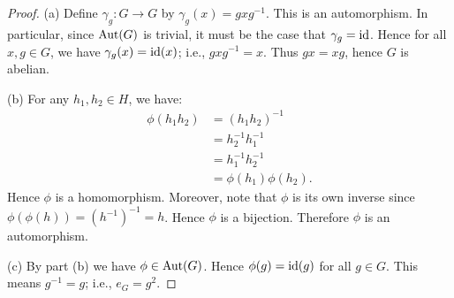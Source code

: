 \documentclass[10pt,twoside,openany]{memoir}
\begin{document}
    {\color{blue} \begin{proof}
        (a) Define $\gamma_g:G \rightarrow G$ by $\gamma_g(x) = gxg^{-1}$. This is an automorphism. In particular, since $\operatorname{Aut}(G)$ is trivial, it must be the case that $\gamma_g = \operatorname{id}$. Hence for all $x,g \in G$, we have $\gamma_g(x) = \operatorname{id}(x)$; i.e., $gxg^{-1} = x$. Thus $gx = xg$, hence $G$ is abelian.

        (b) For any $h_1,h_2 \in H$, we have:
            \begin{equation*}
            \begin{split}
                \phi(h_1 h_2) 
                & = (h_1 h_2)^{-1} \\
                & = h_2^{-1} h_1^{-1} \\
                & = h_1^{-1} h_2^{-1} \\
                & = \phi(h_1) \phi(h_2).
            \end{split}
            \end{equation*}
        Hence $\phi$ is a homomorphism. Moreover, note that $\phi$ is its own inverse since $\phi(\phi(h)) = (h^{-1})^{-1} = h$. Hence $\phi$ is a bijection. Therefore $\phi$ is an automorphism.

        (c) By part (b) we have $\phi \in \operatorname{Aut}(G)$. Hence $\phi(g) = \operatorname{id}(g)$ for all $g \in G$. This means $g^{-1} = g$; i.e., $e_G = g^2$.
    \end{proof}}
\begin{problem}
    
\end{problem}
\end{document}
